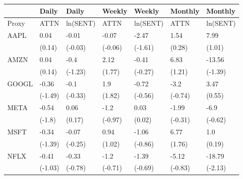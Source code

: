 \begin{tabular}{lllllll}
\toprule
{} &    Daily &     Daily &   Weekly &    Weekly &  Monthly &   Monthly \\
\midrule
Proxy &     ATTN &  ln(SENT) &     ATTN &  ln(SENT) &     ATTN &  ln(SENT) \\
AAPL  &     0.04 &     -0.01 &    -0.07 &     -2.47 &     1.54 &      7.99 \\
      &   (0.14) &   (-0.03) &  (-0.06) &   (-1.61) &   (0.28) &    (1.01) \\
AMZN  &     0.04 &      -0.4 &     2.12 &     -0.41 &     6.83 &    -13.56 \\
      &   (0.14) &   (-1.23) &   (1.77) &   (-0.27) &   (1.21) &   (-1.39) \\
GOOGL &    -0.36 &      -0.1 &      1.9 &     -0.72 &     -3.2 &      3.47 \\
      &  (-1.49) &   (-0.33) &   (1.82) &   (-0.56) &  (-0.74) &    (0.55) \\
META  &    -0.54 &      0.06 &     -1.2 &      0.03 &    -1.99 &      -6.9 \\
      &   (-1.8) &    (0.17) &  (-0.97) &    (0.02) &  (-0.31) &   (-0.62) \\
MSFT  &    -0.34 &     -0.07 &     0.94 &     -1.06 &     6.77 &       1.0 \\
      &  (-1.39) &   (-0.25) &   (1.02) &   (-0.86) &   (1.76) &    (0.19) \\
NFLX  &    -0.41 &     -0.33 &     -1.2 &     -1.39 &    -5.12 &    -18.79 \\
      &  (-1.03) &   (-0.78) &  (-0.71) &   (-0.69) &  (-0.83) &   (-2.13) \\
\bottomrule
\end{tabular}
